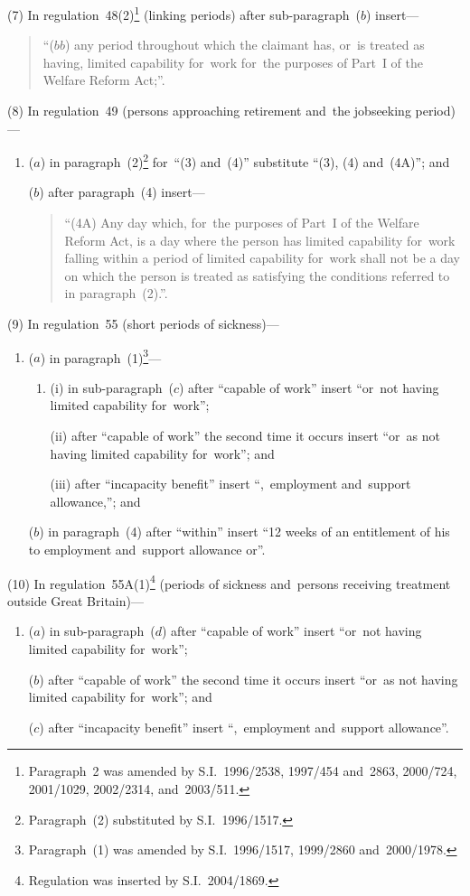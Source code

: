 \documentclass[12pt,a4paper]{article}
\begin{document}
(7) In regulation~48(2)\footnote{Paragraph~2 was amended by S.I.~1996/2538, 1997/454 and~2863, 2000/724, 2001/1029, 2002/2314, and~2003/511.} (linking periods) after sub-paragraph~($b$)  insert—
\begin{quotation}
“($bb$) any period throughout which the claimant has, or~is treated as having, limited capability for~work for~the purposes of Part~I of the Welfare Reform Act;”.
\end{quotation}

(8) In regulation~49 (persons approaching retirement and~the jobseeking period)—
\begin{enumerate}\item[]
($a$) in paragraph~(2)\footnote{Paragraph~(2) substituted by S.I.~1996/1517.} for~“(3) and~(4)” substitute “(3), (4) and~(4A)”; and

($b$) after paragraph~(4) insert—
\begin{quotation}
“(4A) Any day which, for~the purposes of Part~I of the Welfare Reform Act, is a day where the person has limited capability for~work falling within a period of limited capability for~work shall not be a day on which the person is treated as satisfying the conditions referred to in paragraph~(2).”.
\end{quotation}
\end{enumerate}

(9) In regulation~55 (short periods of sickness)—
\begin{enumerate}\item[]
($a$) in paragraph~(1)\footnote{Paragraph~(1) was amended by S.I.~1996/1517, 1999/2860 and~2000/1978.}—
\begin{enumerate}\item[]
(i) in sub-paragraph~($c$)  after “capable of work” insert “or~not having limited capability for~work”;

(ii) after “capable of work” the second time it occurs insert “or~as not having limited capability for~work”; and

(iii) after “incapacity benefit” insert “,~employment and~support allowance,”; and
\end{enumerate}

($b$) in paragraph~(4) after “within” insert “12 weeks of an entitlement of his to employment and~support allowance or”.
\end{enumerate}

(10) In regulation~55A(1)\footnote{Regulation was inserted by S.I.~2004/1869.} (periods of sickness and~persons receiving treatment outside Great Britain)—
\begin{enumerate}\item[]
($a$) in sub-paragraph~($d$)  after “capable of work” insert “or~not having limited capability for~work”;

($b$) after “capable of work” the second time it occurs insert “or~as not having limited capability for~work”; and

($c$) after “incapacity benefit” insert “,~employment and~support allowance”.
\end{enumerate}
\end{document}
